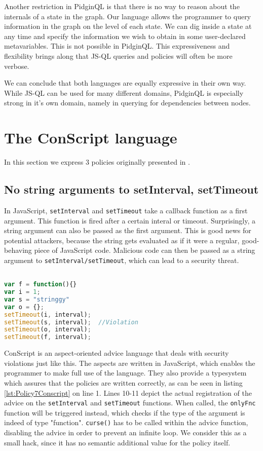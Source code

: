 Another restriction in PidginQL is that there is no way to reason about the internals of a state in the graph. Our language allows the programmer to query information in the graph on the level of each state. We can dig inside a state at any time and specify the information we wish to obtain in some user-declared metavariables. This is not possible in PidginQL. This expressiveness and flexibility brings along that JS-QL queries and policies will often be more verbose.

We can conclude that both languages are equally expressive in their own way. While JS-QL can be used for many different domains, PidginQL is especially strong in it's own domain, namely in querying for dependencies between nodes.

\section{The ConScript language}
\label{sec:ValidationConscript}

In this section we express 3 policies originally presented in \cite{ConScript}.

\subsection{No string arguments to setInterval, setTimeout}

In JavaScript, \texttt{setInterval} and \texttt{setTimeout} take a callback function as a first argument. This function is fired after a certain interal or timeout. Surprisingly, a string argument can also be passed as the first argument. This is good news for potential attackers, because the string gets evaluated as if it were a regular, good-behaving piece of JavaScript code. Malicious code can then be passed as a string argument to \texttt{setInterval/setTimeout}, which can lead to a security threat.


\begin{lstlisting}[label={lst:JSSetTimeout},language=JavaScript,caption=No string arguments to setTimeout,mathescape=true]  % float=t?

var f = function(){}
var i = 1;
var s = "stringgy"
var o = {};
setTimeout(i, interval);
setTimeout(s, interval);  //Violation
setTimeout(o, interval);
setTimeout(f, interval);
\end{lstlisting}

ConScript is an aspect-oriented advice language that deals with security violations just like this. The aspects are written in JavaScript, which enables the programmer to make full use of the language. They also provide a typesystem which assures that the policies are written correctly, as can be seen in listing \ref{lst:Policy7Conscript} on line 1. Lines 10-11 depict the actual registration of the advice on the \texttt{setInterval} and \texttt{setTimeout} functions. When called, the \texttt{onlyFnc} function will be triggered instead, which checks if the type of the argument is indeed of type "function". \texttt{curse()} has to be called within the advice function, disabling the advice in order to prevent an infinite loop. We consider this as a small hack, since it has no semantic additional value for the policy itself.

